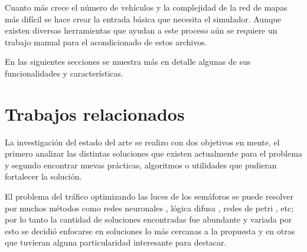 Cuanto más crece el número de vehículos y la complejidad de la red de mapas más difícil se hace crear la entrada básica que necesita el simulador. Aunque existen diversas herramientas que ayudan a este proceso aún se requiere un trabajo manual para el acondicionado de estos archivos.

En las siguientes secciones se muestra más en detalle algunas de sus funcionalidades y características.





\section{Trabajos relacionados}

La investigación del estado del arte se realizo con dos objetivos en mente, el primero analizar las distintas soluciones que existen actualmente para el problema y segundo encontrar nuevas prácticas, algoritmos o utilidades que pudieran fortalecer la solución.

El problema del tráfico optimizando las luces de los semáforos se puede resolver por muchos métodos como  redes neuronales \citep{Lopez1999}, lógica difusa \citep{Lim2001}, redes de petri \citep{DiFebbraro2002}, etc; por lo tanto la cantidad de soluciones encontradas fue abundante y variada por esto se decidió enfocarse en soluciones lo más cercanas a la propuesta y en otras que tuvieran alguna particularidad interesante para destacar.


